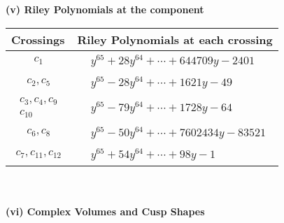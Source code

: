 \documentclass[1p]{elsarticle_modified}
\theoremstyle{definition}
\begin{document}
\newpage\renewcommand{\arraystretch}{1}
\flushleft \textbf{(v) Riley Polynomials at the component}\newline \\
\begin{tabular}{m{50pt}|m{274pt}}
Crossings & \hspace{64pt}Riley Polynomials at each crossing \\
\hline $$\begin{aligned}c_{1}\end{aligned}$$&$\begin{aligned}
&y^{65}+28 y^{64}+\cdots+644709 y-2401
\end{aligned}$\\
\hline $$\begin{aligned}c_{2},c_{5}\end{aligned}$$&$\begin{aligned}
&y^{65}-28 y^{64}+\cdots+1621 y-49
\end{aligned}$\\
\hline $$\begin{aligned}c_{3},c_{4},c_{9}\\c_{10}\end{aligned}$$&$\begin{aligned}
&y^{65}-79 y^{64}+\cdots+1728 y-64
\end{aligned}$\\
\hline $$\begin{aligned}c_{6},c_{8}\end{aligned}$$&$\begin{aligned}
&y^{65}-50 y^{64}+\cdots+7602434 y-83521
\end{aligned}$\\
\hline $$\begin{aligned}c_{7},c_{11},c_{12}\end{aligned}$$&$\begin{aligned}
&y^{65}+54 y^{64}+\cdots+98 y-1
\end{aligned}$\\
\hline
\end{tabular}\\~\\
\newpage\flushleft \textbf{(vi) Complex Volumes and Cusp Shapes}
\end{document}

